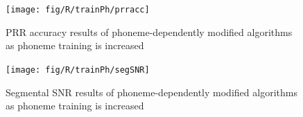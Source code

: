 \begin{figure}[p]
\noindent \begin{centering}
\texttt{[image: fig/R/trainPh/prracc]}
\par\end{centering}

\protect\caption{\label{fig:vary-train-phn-prracc} \acs{PRR} accuracy results of
phoneme-dependently modified algorithms as phoneme training is increased}
\end{figure}


\begin{figure}[p]
\noindent \begin{centering}
\texttt{[image: fig/R/trainPh/segSNR]}
\par\end{centering}

\protect\caption{\label{fig:vary-train-phn-segsnr}Segmental \acs{SNR} results of
phoneme-dependently modified algorithms as phoneme training is increased}
\end{figure}


